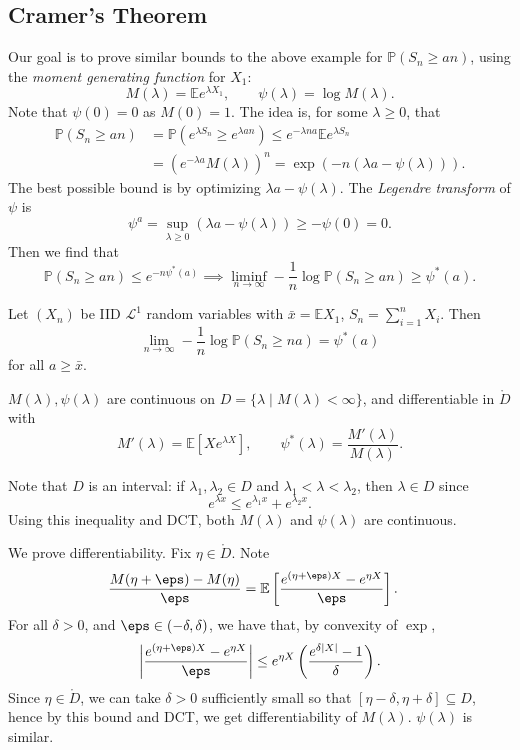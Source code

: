 \documentclass[12pt]{article}
\begin{document}
\subsection{Cramer's Theorem}%
\label{sub:ct}

Our goal is to prove similar bounds to the above example for $\mathbb{P}(S_n \geq an)$, using the \emph{moment generating function} for $X_1$:
\[
M(\lambda) = \mathbb{E} e^{\lambda X_1}, \qquad \psi(\lambda) = \log M(\lambda).
\]
Note that $\psi(0) = 0$ as $M(0) = 1$. The idea is, for some $\lambda \geq 0$, that
\begin{align*}
	\mathbb{P}(S_n \geq an) &= \mathbb{P}( e^{\lambda S_n} \geq e^{\lambda an} ) \leq e^{-\lambda na} \mathbb{E} e^{\lambda S_n} \\
				&= (e^{-\lambda a} M(\lambda))^{n} = \exp (-n (\lambda a - \psi(\lambda))).
\end{align*}
The best possible bound is by optimizing $\lambda a - \psi(\lambda)$. The \emph{Legendre transform} of $\psi$ is
\[
\psi^{a} = \sup_{\lambda \geq 0} (\lambda a - \psi(\lambda)) \geq -\psi(0) = 0.
\]
Then we find that
\[
\mathbb{P}(S_n \geq an) \leq e^{-n \psi^{\ast}(a)} \implies \liminf_{n \to \infty} - \frac 1n \log \mathbb{P}(S_n \geq an) \geq \psi^{\ast}(a).
\]

\begin{theorem}[Cramer]
	Let $(X_n)$ be IID $\mathcal{L}^1$ random variables with $\bar x = \mathbb{E}X_1$, $S_n = \sum_{i=1}^n X_i$. Then
	\[
	\lim_{n \to \infty} - \frac{1}{n} \log \mathbb{P}(S_n \geq na) = \psi^{\ast} (a)
	\]
	for all $a \geq \bar x$.
\end{theorem}

\begin{lemma}
	$M(\lambda), \psi(\lambda)$ are continuous on $D = \{ \lambda \mid M(\lambda) < \infty\}$, and differentiable in $\mathring D$ with
	\[
	M'(\lambda) = \mathbb{E}[X e^{\lambda X}], \qquad \psi^{\ast}(\lambda) = \frac{M'(\lambda)}{M(\lambda)}.
	\]
\end{lemma}

\begin{proofbox}
	Note that $D$ is an interval: if $\lambda_1, \lambda_2 \in D$ and $\lambda_1 < \lambda < \lambda_2$, then $\lambda \in D$ since
	\[
	e^{\lambda x} \leq e^{\lambda_1 x} + e^{\lambda_2x}.
	\]
	Using this inequality and DCT, both $M(\lambda)$ and $\psi(\lambda)$ are continuous.

	We prove differentiability. Fix $\eta \in \mathring D$. Note
	\begin{align*}
		\frac{M(\eta + \eps) - M(\eta)}{\eps} &= \mathbb{E}\left[ \frac{e^{(\eta + \eps) X} - e^{\eta X}}{\eps} \right].
	\end{align*}
	For all $\delta > 0$, and $\eps \in (-\delta, \delta)$, we have that, by convexity of $\exp$,
	\[
	\left| \frac{e^{(\eta + \eps)X} - e^{\eta X}}{\eps} \right| \leq e^{\eta X} \left( \frac{e^{\delta|X|} - 1}{\delta} \right).
	\]
	Since $\eta \in \mathring D$, we can take $\delta > 0$ sufficiently small so that $[\eta - \delta, \eta + \delta] \subseteq D$, hence by this bound and DCT, we get differentiability of $M(\lambda)$. $\psi(\lambda)$ is similar.
\end{proofbox}
\end{document}
